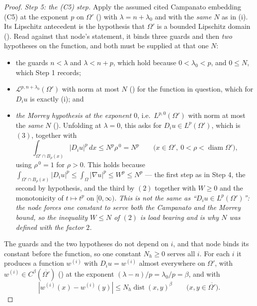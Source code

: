 \begin{proof}
\emph{Step 5: the \textup{(C5)} step.}  Apply the assumed cited Campanato
embedding (C5) at the exponent $p$ on $\Omega'$
() with $\lambda=n+\lambda_0$ and with the
\emph{same} $N$ as in (i).  Its Lipschitz antecedent is the hypothesis that
$\Omega'$ is a bounded Lipschitz domain ().
Read against that node's statement, it binds three guards and then \emph{two}
hypotheses on the function, and both must be supplied at that one $N$:
\begin{itemize}
\item the guards $n<\lambda$ and $\lambda<n+p$, which hold because
  $0<\lambda_0<p$, and $0\le N$, which Step 1 records;
\item $\mathcal L^{p,n+\lambda_0}(\Omega')$ with norm at most $N$
  () for the function in question, which for $D_iu$ is
  exactly (i); and
\item \emph{the Morrey hypothesis at the exponent $0$}, i.e.\
  $L^{p,0}(\Omega')$ with norm at most the \emph{same} $N$
  ().  Unfolding  at $\lambda=0$,
  this asks for $D_iu\in L^p(\Omega')$, which is $(3)$, together with
  \[
  \int_{\Omega'\cap B_\rho(x)}|D_iu|^p\,dx\le N^p\rho^{\,0}=N^p
  \qquad\bigl(x\in\Omega',\ 0<\rho<\operatorname{diam}\Omega'\bigr),
  \]
  using $\rho^{\,0}=1$ for $\rho>0$.  This holds because
  $\int_{\Omega'\cap B_\rho(x)}|D_iu|^p\le\int_\Omega|\nabla u|^p\le W^p\le N^p$
  --- the first step as in Step 4, the second by hypothesis, and the third by
  $(2)$ together with $W\ge0$ and the monotonicity of $t\mapsto t^p$ on
  $[0,\infty)$.  \emph{This is not the same as ``$D_iu\in L^p(\Omega')$'': the
  node forces one constant to serve both the Campanato and the Morrey bound, so
  the inequality $W\le N$ of $(2)$ is load bearing and is why $N$ was defined
  with the factor $2$.}
\end{itemize}
The guards and the two hypotheses do not depend on $i$, and that node binds its
constant before the function, so one constant $N_h\ge0$ serves all $i$.  For
each $i$ it produces a function $w^{(i)}$ with $D_iu=w^{(i)}$ almost everywhere
on $\Omega'$, with $w^{(i)}\in C^{\beta}(\overline{\Omega'})$
() at the exponent $(\lambda-n)/p=\lambda_0/p=\beta$, and
with
\[
|w^{(i)}(x)-w^{(i)}(y)|\le N_h\operatorname{dist}(x,y)^{\beta}
\qquad\bigl(x,y\in\overline{\Omega'}\bigr).
\]


\end{proof}
